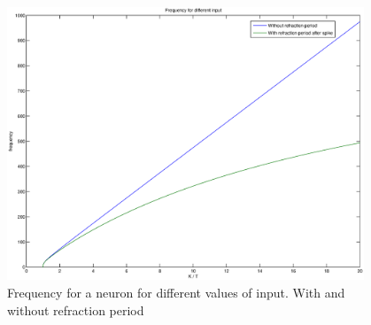 \begin{figure}[bhtp]
	\label{figFrekvensMedOgUtenRefractionPeriod}
	\begin{center}
		\includegraphics[width=0.95\textwidth]{frekvensPlotRefractionPeriod.eps}
	\end{center}
	\caption{Frequency for a neuron for different values of input. With and without refraction period}
\end{figure}













